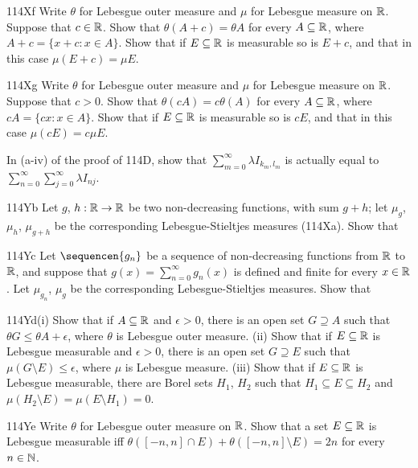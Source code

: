 {\sqheader 114Xf Write $\theta$ for Lebesgue outer measure and $\mu$
for Lebesgue
measure on $\Bbb R$.   Suppose that $c\in\Bbb R$.   Show that
$\theta(A+c)=\theta A$ for every $A\subseteq\Bbb R$, where
$A+c=\{x+c:x\in A\}$.   Show that if $E\subseteq \Bbb R$ is measurable
so is $E+c$, and that in this case $\mu(E+c)=\mu E$.

\spheader 114Xg Write $\theta$ for Lebesgue outer measure and $\mu$
for Lebesgue
measure on $\Bbb R$.   Suppose that $c>0$.   Show that
$\theta(cA)=c\theta(A)$ for every $A\subseteq\Bbb R$, where
$cA=\{cx:x\in A\}$.
Show that if $E\subseteq \Bbb R$ is measurable so is $cE$,
and that in this case $\mu(cE)=c\mu E$.

In (a-iv) of the proof of 114D, show that $\sum_{m=0}^{\infty}\lambda
I_{k_m,l_m}$ is actually equal to
$\sum_{n=0}^{\infty}\sum_{j=0}^{\infty}\lambda I_{nj}$.

\spheader 114Yb Let $g$, $h:\Bbb R\to\Bbb R$ be two non-decreasing
functions, with sum $g+h$;  let $\mu_g$, $\mu_h$, $\mu_{g+h}$ be the
corresponding Lebesgue-Stieltjes measures (114Xa).   Show that

\spheader 114Yc Let $\sequencen{g_n}$ be a sequence of non-decreasing
functions from $\Bbb R$ to $\Bbb R$, and suppose that
$g(x)=\sum_{n=0}^{\infty}g_n(x)$ is defined and finite for every
$x\in\Bbb R$.   Let $\mu_{g_n}$, $\mu_g$ be the corresponding
Lebesgue-Stieltjes measures.   Show that


\spheader 114Yd(i) Show that if $A\subseteq\Bbb R$
and $\epsilon>0$, there is
an open set $G\supseteq A$ such that $\theta G\le\theta A+\epsilon$,
where $\theta$ is Lebesgue outer measure.  (ii) Show that if
$E\subseteq\Bbb R$ is Lebesgue measurable and $\epsilon>0$, there is an
open set $G\supseteq E$ such that $\mu(G\setminus E)\le\epsilon$, where
$\mu$ is Lebesgue measure.      (iii) Show that if $E\subseteq\Bbb R$ is Lebesgue
measurable, there are Borel sets $H_1$, $H_2$ such that $H_1\subseteq
E\subseteq H_2$ and $\mu(H_2\setminus E)=\mu(E\setminus H_1)=0$.

\spheader 114Ye Write $\theta$ for Lebesgue outer measure on
$\Bbb R$.   Show
that a set $E\subseteq\Bbb R$ is Lebesgue measurable iff
$\theta([-n,n]\cap E)+\theta([-n,n]\setminus E)=2n$ for every
$n\in\Bbb N$.   

}

